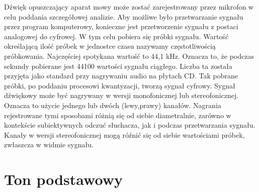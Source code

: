 \documentclass[a4paper,12 pt]{report}
\begin{document}
Dźwięk opuszczający aparat mowy może zostać zarejestrowany przez mikrofon w celu poddania szczegółowej analizie. Aby możliwe było przetwarzanie sygnału przez program komputerowy, konieczne jest przetworzenie sygnału z postaci analogowej do cyfrowej. W tym celu pobiera się próbki sygnału. Wartość określającą ilość próbek w jednostce czasu nazywamy częstotliwością próbkowania. Najczęściej spotykana wartość to 44,1 kHz. Oznacza to, że podczas sekundy pobierane jest 44100 wartości sygnału ciągłego. Liczba ta została przyjęta jako standard przy nagrywaniu audio na płytach CD. Tak pobrane próbki, po poddaniu procesowi kwantyzacji, tworzą sygnał cyfrowy.
Sygnał dźwiękowy może być nagrywany w wersji monofonicznej lub stereofonicznej. Oznacza to użycie jednego lub dwóch (lewy,prawy) kanałów. Nagrania rejestrowane tymi sposobami różnią się od siebie diametralnie, zarówno w kontekście subiektywnych odczuć słuchacza, jak i podczas przetwarzania sygnału. Kanały w wersji stereofonicznej mogą róźnić się od siebie wartościami próbek, zwłaszcza w widmie sygnału.





\section{Ton podstawowy}
\end{document}
